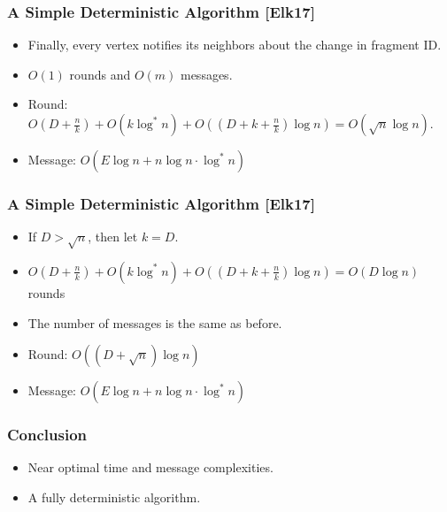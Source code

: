 \begin{frame}
\frametitle{A Simple Deterministic Algorithm [Elk17]}
\begin{itemize}
    \item Finally, every vertex notifies its neighbors about the change in fragment ID. 
    \item $O(1)$ rounds and $O(m)$ messages.
    \item Round: $O(D+\frac{n}{k}) + O(k\log^* n) + O((D + k + \frac{n}{k})\log n) = O(\sqrt{n}\log n)$.
    \item Message: $O(E \log n + n\log n \cdot \log^* n)$
\end{itemize}
\end{frame}

\begin{frame}
\frametitle{A Simple Deterministic Algorithm [Elk17]}
\begin{itemize}
    \item If $D > \sqrt{n}$, then let $k=D$.
    \item $O(D+\frac{n}{k}) + O(k\log^* n) + O((D + k + \frac{n}{k})\log n) = O(D\log n)$ rounds
    \item The number of messages is the same as before.
    \item Round: $O((D + \sqrt{n})\log n)$
    \item Message: $O(E \log n + n\log n \cdot \log^* n)$
\end{itemize}
\end{frame}


\begin{frame}
\frametitle{Conclusion}
\begin{itemize}
    \item Near optimal time and message complexities.
    \item A fully deterministic algorithm.
\end{itemize}


\end{frame}
